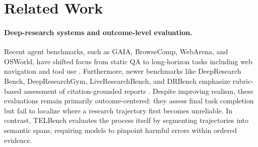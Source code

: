 



\section{Related Work}


\paragraph{Deep-research systems and outcome-level evaluation.}
Recent agent benchmarks, such as GAIA, BrowseComp, WebArena, and OSWorld, have shifted focus from static QA to long-horizon tasks including web navigation and tool use \citep{mialon2023gaiabenchmarkgeneralai, wei2025browsecomp, zhou2024webarenarealisticwebenvironment, xie2024osworldbenchmarkingmultimodalagents}. Furthermore, newer benchmarks like DeepResearch Bench, DeepResearchGym, LiveResearchBench, and DRBench emphasize rubric-based assessment of citation-grounded reports \citep{du2025deepresearchbenchcomprehensivebenchmark, coelho2025deepresearchgymfreetransparentreproducible, wang2026liveresearchbenchlivebenchmarkusercentric, abaskohi2026drbenchrealisticbenchmarkenterprise}. Despite improving realism, these evaluations remain primarily outcome-centered: they assess final task completion but fail to localize where a research trajectory first becomes unreliable. In contrast, TELBench evaluates the process itself by segmenting trajectories into semantic spans, requiring models to pinpoint harmful errors within ordered evidence.

